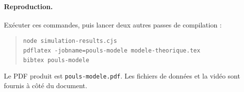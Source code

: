 \documentclass[11pt,a4paper]{article}
\begin{document}
\paragraph{Reproduction.}
Exécuter ces commandes, puis lancer deux autres passes de compilation :
\begin{quote}\small
\begin{verbatim}
node simulation-results.cjs
pdflatex -jobname=pouls-modele modele-theorique.tex
bibtex pouls-modele
\end{verbatim}
\end{quote}
Le PDF produit est \texttt{pouls-modele.pdf}.
Les fichiers de données et la vidéo sont fournis à côté du document.



\end{document}

